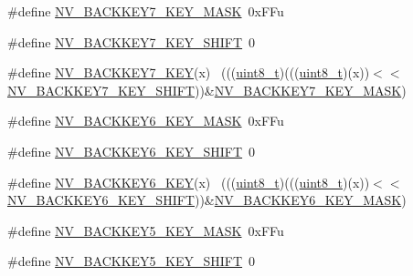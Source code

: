 \begin{DoxyCompactItemize}
\item 
\#define \hyperlink{group___n_v___register___masks_gac3f2bc7dd55b7951d70a5d1fcb6552b8}{N\+V\+\_\+\+B\+A\+C\+K\+K\+E\+Y7\+\_\+\+K\+E\+Y\+\_\+\+M\+A\+SK}~0x\+F\+Fu
\item 
\#define \hyperlink{group___n_v___register___masks_gad6bef74e61e792dfa5b7d195e4ce5620}{N\+V\+\_\+\+B\+A\+C\+K\+K\+E\+Y7\+\_\+\+K\+E\+Y\+\_\+\+S\+H\+I\+FT}~0
\item 
\#define \hyperlink{group___n_v___register___masks_gad81b2addd996d3f0ee299e252d88b0a9}{N\+V\+\_\+\+B\+A\+C\+K\+K\+E\+Y7\+\_\+\+K\+EY}(x)                                          ~(((\hyperlink{_p_e___types_8h_aba7bc1797add20fe3efdf37ced1182c5}{uint8\+\_\+t})(((\hyperlink{_p_e___types_8h_aba7bc1797add20fe3efdf37ced1182c5}{uint8\+\_\+t})(x))$<$$<$\hyperlink{group___n_v___register___masks_gad6bef74e61e792dfa5b7d195e4ce5620}{N\+V\+\_\+\+B\+A\+C\+K\+K\+E\+Y7\+\_\+\+K\+E\+Y\+\_\+\+S\+H\+I\+FT}))\&\hyperlink{group___n_v___register___masks_gac3f2bc7dd55b7951d70a5d1fcb6552b8}{N\+V\+\_\+\+B\+A\+C\+K\+K\+E\+Y7\+\_\+\+K\+E\+Y\+\_\+\+M\+A\+SK})
\item 
\#define \hyperlink{group___n_v___register___masks_ga44e2d846ef1b9d5ad94a707fa6f29ae1}{N\+V\+\_\+\+B\+A\+C\+K\+K\+E\+Y6\+\_\+\+K\+E\+Y\+\_\+\+M\+A\+SK}~0x\+F\+Fu
\item 
\#define \hyperlink{group___n_v___register___masks_ga271a532af55987843f56d660efb5d440}{N\+V\+\_\+\+B\+A\+C\+K\+K\+E\+Y6\+\_\+\+K\+E\+Y\+\_\+\+S\+H\+I\+FT}~0
\item 
\#define \hyperlink{group___n_v___register___masks_gaf79c4e3cdf4165b1f5158054ec642039}{N\+V\+\_\+\+B\+A\+C\+K\+K\+E\+Y6\+\_\+\+K\+EY}(x)                                          ~(((\hyperlink{_p_e___types_8h_aba7bc1797add20fe3efdf37ced1182c5}{uint8\+\_\+t})(((\hyperlink{_p_e___types_8h_aba7bc1797add20fe3efdf37ced1182c5}{uint8\+\_\+t})(x))$<$$<$\hyperlink{group___n_v___register___masks_ga271a532af55987843f56d660efb5d440}{N\+V\+\_\+\+B\+A\+C\+K\+K\+E\+Y6\+\_\+\+K\+E\+Y\+\_\+\+S\+H\+I\+FT}))\&\hyperlink{group___n_v___register___masks_ga44e2d846ef1b9d5ad94a707fa6f29ae1}{N\+V\+\_\+\+B\+A\+C\+K\+K\+E\+Y6\+\_\+\+K\+E\+Y\+\_\+\+M\+A\+SK})
\item 
\#define \hyperlink{group___n_v___register___masks_gab1e58bd037f31bcaa1b96a71340315ba}{N\+V\+\_\+\+B\+A\+C\+K\+K\+E\+Y5\+\_\+\+K\+E\+Y\+\_\+\+M\+A\+SK}~0x\+F\+Fu
\item 
\#define \hyperlink{group___n_v___register___masks_ga68762e18611e6dfaed3ddfd7847c09f4}{N\+V\+\_\+\+B\+A\+C\+K\+K\+E\+Y5\+\_\+\+K\+E\+Y\+\_\+\+S\+H\+I\+FT}~0

\end{DoxyCompactItemize}
